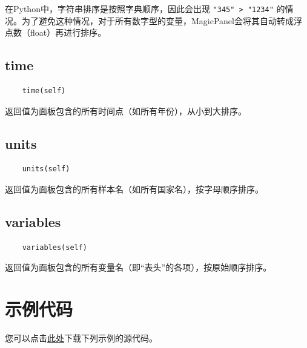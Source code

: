 \documentclass[a4paper, UTF8, fontset=none]{ctexart}
\begin{document}
    在Python中，字符串排序是按照字典顺序，因此会出现 \verb|"345" > "1234"| 的情况。为了避免这种情况，对于所有数字型的变量，MagicPanel会将其自动转成浮点数（float）再进行排序。

\subsection{time}

    \begin{lstlisting}
    time(self)
    \end{lstlisting}    

    返回值为面板包含的所有时间点（如所有年份），从小到大排序。

\subsection{units}

    \begin{lstlisting}
    units(self)
    \end{lstlisting}    

    返回值为面板包含的所有样本名（如所有国家名），按字母顺序排序。

\subsection{variables}

    \begin{lstlisting}
    variables(self)
    \end{lstlisting}    

    返回值为面板包含的所有变量名（即“表头”的各项），按原始顺序排序。

\section{示例代码\label{example}}

您可以点击\href{https://github.com/PKU-Zyf/MagicPanel/blob/main/example.py}{此处}下载下列示例的源代码。
\end{document}
